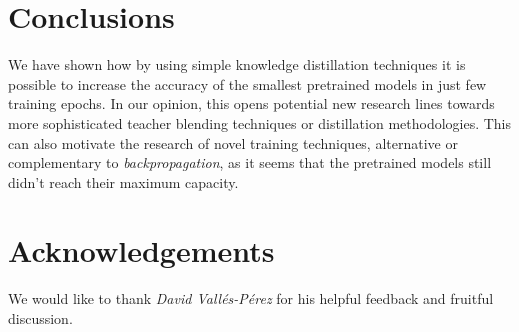 \documentclass{elsarticle}
\begin{document}
	\section{Conclusions}  \label{sec:conclusions}
	We have shown how by using simple knowledge distillation techniques it is possible to increase the accuracy of the smallest pretrained models in just few training epochs. In our opinion, this opens potential new research lines towards more sophisticated teacher blending techniques or distillation methodologies. This can also motivate the research of novel training techniques, alternative or complementary to \textit{backpropagation}, as it seems that the pretrained models still didn't reach their maximum capacity.
	
	
	\section{Acknowledgements}
	We would like to thank \textit{David Vallés-Pérez} for his helpful feedback and fruitful discussion.
	\newpage
	
	
	
	
\end{document}
